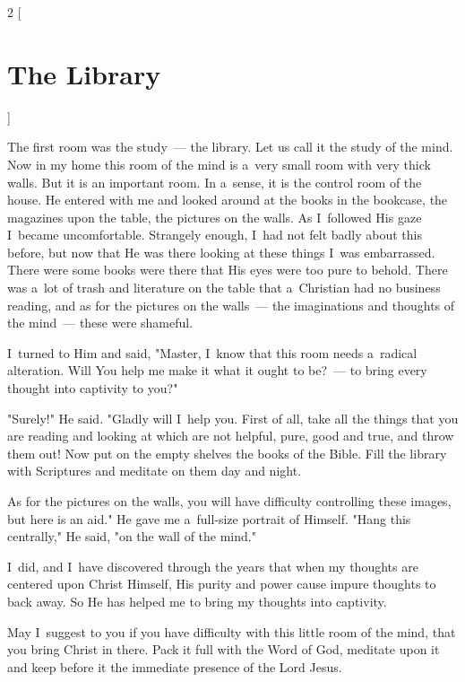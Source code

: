 \documentclass[a4paper,12pt]{article}
\begin{document}
\begin{multicols}{2}
    [
\section*{The Library}
    ]

The first room was the study~--- the library. Let us call it the study of the mind. Now in my home this room of the mind is a~very small room with very thick walls. But it is an important room. In a~sense, it is the control room of the house. He entered with me and looked around at the books in the bookcase, the magazines upon the table, the pictures on the walls. As I~followed His gaze I~became uncomfortable. Strangely enough, I~had not felt badly about this before, but now that He was there looking at these things I~was embarrassed. There were some books were there that His eyes were too pure to behold. There was a~lot of trash and literature on the table that a~Christian had no business reading, and as for the pictures on the walls~--- the imaginations and thoughts of the mind~--- these were shameful. 

I~turned to Him and said, "Master, I~know that this room needs a~radical alteration. Will You help me make it what it ought to be?~--- to bring every thought into captivity to you?" 

"Surely!" He said. "Gladly will I~help you. First of all, take all the things that you are reading and looking at which are not helpful, pure, good and true, and throw them out! Now put on the empty shelves the books of the Bible. Fill the library with Scriptures and meditate on them day and night. 

As for the pictures on the walls, you will have difficulty controlling these images, but here is an aid." He gave me a~full-size portrait of Himself. "Hang this centrally," He said, "on the wall of the mind." 

I~did, and I~have discovered through the years that when my thoughts are centered upon Christ Himself, His purity and power cause impure thoughts to back away. So He has helped me to bring my thoughts into captivity. 

May I~suggest to you if you have difficulty with this little room of the mind, that you bring Christ in there. Pack it full with the Word of God, meditate upon it and keep before it the immediate presence of the Lord Jesus. 
\end{multicols}
\end{document}
